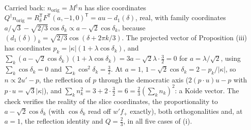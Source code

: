 Carried back: $n_{\mathrm{orig}} = M^{\dagger}n$ has slice coordinates $Q^{\dagger}n_{\mathrm{orig}} = R_{\delta}^{\mathsf T}F^{\mathsf T}(a, -1, 0)^{\mathsf T} = au - d_{1}(\delta)$, real, with family coordinates $a/\sqrt3 - \sqrt{2/3}\cos\delta_{k} \propto a - \sqrt2\cos\delta_{k}$, because $(d_{1}(\delta))_{k} = \sqrt{2/3}\cos(\delta + 2\pi k/3)$. The projected vector of Proposition (iii) has coordinates $p_{k} = |\kappa|(1 + \lambda\cos\delta_{k})$, and $\sum_{k}(a - \sqrt2\cos\delta_{k})(1 + \lambda\cos\delta_{k}) = 3a - \sqrt2\lambda\cdot\tfrac32 = 0$ for $a = \lambda/\sqrt2$, using $\sum_{k}\cos\delta_{k} = 0$ and $\sum_{k}\cos^{2}\delta_{k} = \tfrac32$. At $a = 1$, $1 - \sqrt2\cos\delta_{k} = 2 - p_{k}/|\kappa|$, so $n \propto 2u' - p$, the reflection of $p$ through the democratic axis ($2(p\cdot u)u - p$ with $p\cdot u = \sqrt3|\kappa|$), and $\sum_{k}n_{k}^{2} = 3 + 2\cdot\tfrac32 = 6 = \tfrac23(\sum_{k}n_{k})^{2}$: a Koide vector. The check verifies the reality of the slice coordinates, the proportionality to $a - \sqrt2\cos\delta_{k}$ (with $\cos\delta_{k}$ read off $w'f_{+}$ exactly), both orthogonalities and, at $a = 1$, the reflection identity and $Q = \tfrac23$, in all five cases of (i).

